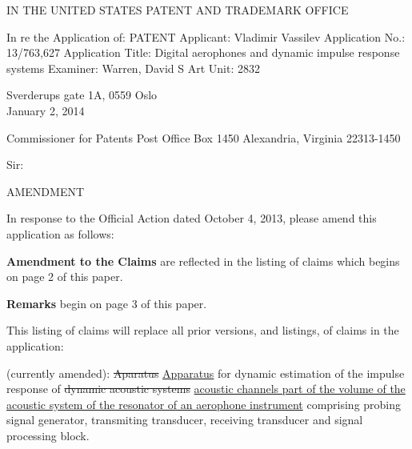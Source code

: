 
\usepackage{ulem}



IN THE UNITED STATES PATENT AND TRADEMARK OFFICE


In re the Application of: PATENT \newline
Applicant: Vladimir Vassilev \newline
Application No.: 13/763,627 \newline
Application Title: Digital aerophones and dynamic impulse response
systems \newline
Examiner: Warren, David S \newline
Art Unit: 2832 \newline


\begingroup
\setlength\parindent{3.6in}
Sverderups gate 1A, 0559 Oslo \\ January 2, 2014
\endgroup

Commissioner for Patents \newline
Post Office Box 1450 \newline
Alexandria, Virginia 22313-1450 \newline

Sir:
\begin{center}
AMENDMENT
\end{center}



In response to the Official Action dated October 4, 2013, please amend
this application as follows:

\textbf{Amendment to the Claims} are reflected in the listing of claims which begins on page 2 of this paper.

\textbf{Remarks} begin on page 3 of this paper.

\newpage
{}

This listing of claims will replace all prior versions, and listings, of
claims in the application:

\cl (currently amended): \sout{Aparatus} \uline{Apparatus} for dynamic estimation of the impulse response of \sout{dynamic acoustic systems} \uline{acoustic channels part of the volume of the acoustic system of the resonator of an aerophone instrument} comprising probing signal generator, transmiting transducer, receiving transducer and signal processing block.


